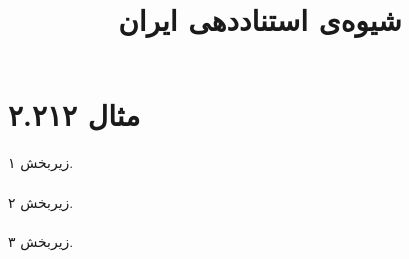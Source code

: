 \documentclass[a4paper,10pt]{article}
\begin{document}
\title{شیوه‌ی استناددهی ایران}
\author{}
\date{}
\maketitle



\section*{مثال ۲.۲۱۲}

زیربخش ۱.\\
\cite{رضائیان1370الف}\\

زیربخش ۲.\\
\cite{رضائیان1370ب}\\

زیربخش ۳.\\
\cite{رضائیان1370پ}\\






\end{document}

